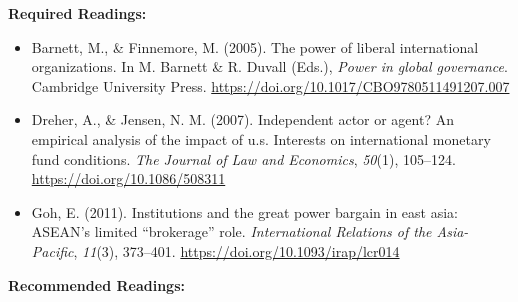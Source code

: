 \documentclass[
  letterpaper,
  DIV=11,
  numbers=noendperiod]{scrartcl}
\providecommand{\tightlist}{%
  \setlength{\itemsep}{0pt}\setlength{\parskip}{0pt}}\usepackage{longtable,booktabs,array}
\begin{document}
\textbf{Required Readings:}

\begin{itemize}
\tightlist
\item
  Barnett, M., \& Finnemore, M. (2005). The power of liberal
  international organizations. In M. Barnett \& R. Duvall (Eds.),
  \emph{Power in global governance}. Cambridge University Press.
  \url{https://doi.org/10.1017/CBO9780511491207.007}
\item
  Dreher, A., \& Jensen, N. M. (2007). Independent actor or agent? An
  empirical analysis of the impact of u.s. Interests on international
  monetary fund conditions. \emph{The Journal of Law and Economics},
  \emph{50}(1), 105--124. \url{https://doi.org/10.1086/508311}
\item
  Goh, E. (2011). Institutions and the great power bargain in east asia:
  {ASEAN}'s limited {``brokerage''} role. \emph{International Relations
  of the Asia-Pacific}, \emph{11}(3), 373--401.
  \url{https://doi.org/10.1093/irap/lcr014}
\end{itemize}

\textbf{Recommended Readings:}
\end{document}
